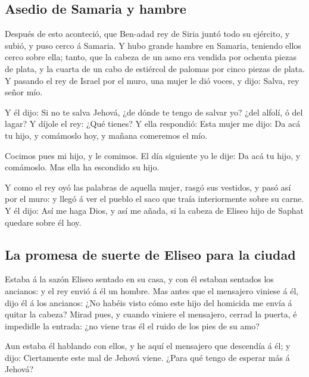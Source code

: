 \hypertarget{asedio-de-samaria-y-hambre}{%
\subsection{Asedio de Samaria y
hambre}\label{asedio-de-samaria-y-hambre}}

 Después de esto aconteció, que Ben-adad rey de Siria juntó
todo su ejército, y subió, y puso cerco á Samaria.  Y hubo
grande hambre en Samaria, teniendo ellos cerco sobre ella; tanto, que la
cabeza de un asno era vendida por ochenta piezas de plata, y la cuarta
de un cabo de estiércol de palomas por cinco piezas de plata.
 Y pasando el rey de Israel por el muro, una mujer le dió
voces, y dijo: Salva, rey señor mío.

 Y él dijo: Si no te salva Jehová, ¿de dónde te tengo de
salvar yo? ¿del alfolí, ó del lagar?  Y díjole el rey: ¿Qué
tienes? Y ella respondió: Esta mujer me dijo: Da acá tu hijo, y
comámoslo hoy, y mañana comeremos el mío.

 Cocimos pues mi hijo, y le comimos. El día siguiente yo le
dije: Da acá tu hijo, y comámoslo. Mas ella ha escondido su hijo.

 Y como el rey oyó las palabras de aquella mujer, rasgó sus
vestidos, y pasó así por el muro: y llegó á ver el pueblo el saco que
traía interiormente sobre su carne.  Y él dijo: Así me haga
Dios, y así me añada, si la cabeza de Eliseo hijo de Saphat quedare
sobre él hoy.

\hypertarget{la-promesa-de-suerte-de-eliseo-para-la-ciudad}{%
\subsection{La promesa de suerte de Eliseo para la
ciudad}\label{la-promesa-de-suerte-de-eliseo-para-la-ciudad}}

 Estaba á la sazón Eliseo sentado en su casa, y con él
estaban sentados los ancianos: y el rey envió á él un hombre. Mas antes
que el mensajero viniese á él, dijo él á los ancianos: ¿No habéis visto
cómo este hijo del homicida me envía á quitar la cabeza? Mirad pues, y
cuando viniere el mensajero, cerrad la puerta, é impedidle la entrada:
¿no viene tras él el ruido de los pies de su amo?

 Aun estaba él hablando con ellos, y he aquí el mensajero
que descendía á él; y dijo: Ciertamente este mal de Jehová viene. ¿Para
qué tengo de esperar más á Jehová?

